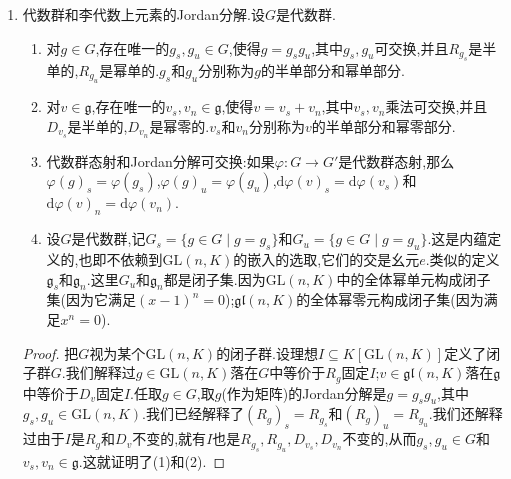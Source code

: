 \begin{enumerate}
\begin{proof}
		【】
	\end{proof}
	\item 代数群和李代数上元素的Jordan分解.设$G$是代数群.
	\begin{enumerate}[(1)]
		\item 对$g\in G$,存在唯一的$g_s,g_u\in G$,使得$g=g_sg_u$,其中$g_s,g_u$可交换,并且$R_{g_s}$是半单的,$R_{g_u}$是幂单的.$g_s$和$g_u$分别称为$g$的半单部分和幂单部分.
		\item 对$v\in\mathfrak{g}$,存在唯一的$v_s,v_n\in\mathfrak{g}$,使得$v=v_s+v_n$,其中$v_s,v_n$乘法可交换,并且$D_{v_s}$是半单的,$D_{v_n}$是幂零的.$v_s$和$v_n$分别称为$v$的半单部分和幂零部分.
		\item 代数群态射和Jordan分解可交换:如果$\varphi:G\to G'$是代数群态射,那么$\varphi(g)_s=\varphi(g_s)$,$\varphi(g)_u=\varphi(g_u)$,$\mathrm{d}\varphi(v)_s=\mathrm{d}\varphi(v_s)$和$\mathrm{d}\varphi(v)_n=\mathrm{d}\varphi(v_n)$.
		\item 设$G$是代数群,记$G_s=\{g\in G\mid g=g_s\}$和$G_u=\{g\in G\mid g=g_u\}$.这是内蕴定义的,也即不依赖到$\mathrm{GL}(n,K)$的嵌入的选取,它们的交是幺元$e$.类似的定义$\mathfrak{g}_s$和$\mathfrak{g}_n$.这里$G_u$和$\mathfrak{g}_n$都是闭子集.因为$\mathrm{GL}(n,K)$中的全体幂单元构成闭子集(因为它满足$(x-1)^n=0$);$\mathfrak{gl}(n,K)$的全体幂零元构成闭子集(因为满足$x^n=0$).
	\end{enumerate}
    \begin{proof}
    	
    	把$G$视为某个$\mathrm{GL}(n,K)$的闭子群.设理想$I\subseteq K[\mathrm{GL}(n,K)]$定义了闭子群$G$.我们解释过$g\in\mathrm{GL}(n,K)$落在$G$中等价于$R_g$固定$I$;$v\in\mathfrak{gl}(n,K)$落在$\mathfrak{g}$中等价于$D_v$固定$I$.任取$g\in G$,取$g$(作为矩阵)的Jordan分解是$g=g_sg_u$,其中$g_s,g_u\in\mathrm{GL}(n,K)$.我们已经解释了$(R_g)_s=R_{g_s}$和$(R_g)_u=R_{g_u}$.我们还解释过由于$I$是$R_g$和$D_v$不变的,就有$I$也是$R_{g_s},R_{g_u},D_{v_s},D_{v_n}$不变的,从而$g_s,g_u\in G$和$v_s,v_n\in\mathfrak{g}$.这就证明了(1)和(2).
    	
    	\qquad
    	

\end{proof}
\end{enumerate}
